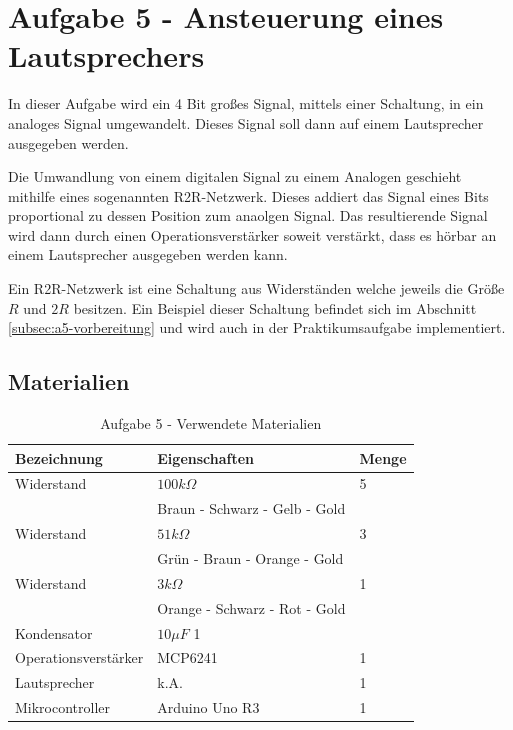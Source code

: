 \section{Aufgabe 5 - Ansteuerung eines Lautsprechers}
\label{sec:aufgabe-5---ansteuerung-eines-lautsprechers}

In dieser Aufgabe wird ein 4 Bit großes Signal, mittels einer Schaltung, in ein analoges Signal umgewandelt.
Dieses Signal soll dann auf einem Lautsprecher ausgegeben werden.

Die Umwandlung von einem digitalen Signal zu einem Analogen geschieht mithilfe eines sogenannten R2R-Netzwerk.
Dieses addiert das Signal eines Bits proportional zu dessen Position zum anaolgen Signal.
Das resultierende Signal wird dann durch einen Operationsverstärker soweit verstärkt, dass es hörbar an einem Lautsprecher ausgegeben werden kann.

Ein R2R-Netzwerk ist eine Schaltung aus Widerständen welche jeweils die Größe $R$ und $2R$ besitzen.
Ein Beispiel dieser Schaltung befindet sich im Abschnitt \ref{subsec:a5-vorbereitung} und wird auch in der Praktikumsaufgabe implementiert.

\subsection{Materialien}
\label{subsec:a5-materialien}

\begin{table}[h]
    \centering
    \caption{Aufgabe 5 - Verwendete Materialien}
    \label{tab:a5-materialien}
    \begin{tabular}{| l | l | l |}
        \hline
        Bezeichnung & Eigenschaften & Menge \\
        \hline
        Widerstand  & $100k\Omega$   & 5     \\
        & Braun - Schwarz - Gelb - Gold & \\
        Widerstand  & $51k\Omega$   & 3   \\
        & Grün - Braun - Orange - Gold & \\
        Widerstand  & $3k\Omega$   & 1   \\
        & Orange - Schwarz - Rot - Gold  & \\
        Kondensator & $10\mu F$ 1 \\
        Operationsverstärker & MCP6241 & 1 \\
        Lautsprecher & k.A. & 1 \\
        Mikrocontroller & Arduino Uno R3 & 1 \\
        \hline
    \end{tabular}
\end{table}

